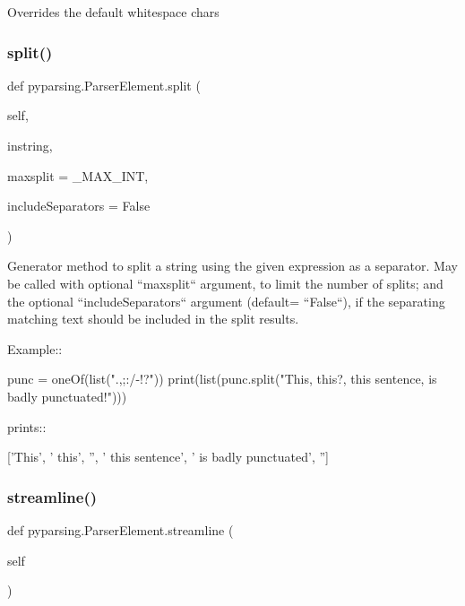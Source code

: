 \begin{DoxyVerb}Overrides the default whitespace chars
\end{DoxyVerb}
 \mbox{\label{classpyparsing_1_1ParserElement_a8db51e82054675b073d5d03b58da4091}} 
\subsubsection{\texorpdfstring{split()}{split()}}
{\footnotesize\ttfamily def pyparsing.\+Parser\+Element.\+split (\begin{DoxyParamCaption}\item[{}]{self,  }\item[{}]{instring,  }\item[{}]{maxsplit = {\ttfamily \+\_\+MAX\+\_\+INT},  }\item[{}]{include\+Separators = {\ttfamily False} }\end{DoxyParamCaption})}

\begin{DoxyVerb}Generator method to split a string using the given expression as a separator.
May be called with optional ``maxsplit`` argument, to limit the number of splits;
and the optional ``includeSeparators`` argument (default= ``False``), if the separating
matching text should be included in the split results.

Example::

    punc = oneOf(list(".,;:/-!?"))
    print(list(punc.split("This, this?, this sentence, is badly punctuated!")))

prints::

    ['This', ' this', '', ' this sentence', ' is badly punctuated', '']
\end{DoxyVerb}
 \mbox{\label{classpyparsing_1_1ParserElement_a09856e9ee0198b9e5da936e4f401f2f2}} 
\subsubsection{\texorpdfstring{streamline()}{streamline()}}
{\footnotesize\ttfamily def pyparsing.\+Parser\+Element.\+streamline (\begin{DoxyParamCaption}\item[{}]{self }\end{DoxyParamCaption})}

